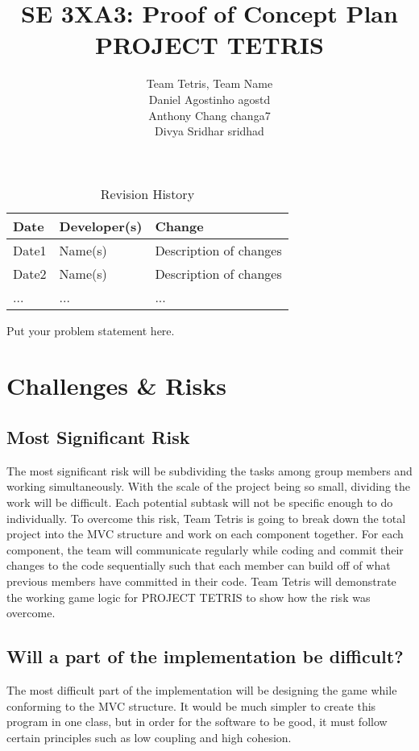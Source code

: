 \documentclass{article}
\title{SE 3XA3: Proof of Concept Plan\\PROJECT TETRIS}
\author{Team Tetris, Team Name
		\\ Daniel Agostinho agostd
		\\ Anthony Chang changa7
		\\ Divya Sridhar sridhad
}
\date{}
\begin{document}
\begin{table}[hp]
\caption{Revision History} \label{TblRevisionHistory}
\begin{tabularx}{\textwidth}{llX}
\toprule
\textbf{Date} & \textbf{Developer(s)} & \textbf{Change}\\
\midrule
Date1 & Name(s) & Description of changes\\
Date2 & Name(s) & Description of changes\\
... & ... & ...\\
\bottomrule
\end{tabularx}
\end{table}

\newpage

\maketitle

Put your problem statement here.

\section{Challenges & Risks}
\subsection{Most Significant Risk}
The most significant risk will be subdividing the tasks among group members and working simultaneously. With the scale of the project being so small, dividing the work will be difficult. Each potential subtask will not be specific enough to do individually. To overcome this risk, Team Tetris is going to break down the total project into the MVC structure and work on each component together. For each component, the team will communicate regularly while coding and commit their changes to the code sequentially such that each member can build off of what previous members have committed in their code. Team Tetris will demonstrate the working game logic for PROJECT TETRIS to show how the risk was overcome. 
\subsection{Will a part of the implementation be difficult?}
The most difficult part of the implementation will be designing the game while conforming to the MVC structure. It would be much simpler to create this program in one class, but in order for the software to be good, it must follow certain principles such as low coupling and high cohesion. 
\end{document}
